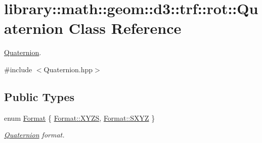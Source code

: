 \hypertarget{classlibrary_1_1math_1_1geom_1_1d3_1_1trf_1_1rot_1_1_quaternion}{}\section{library\+:\+:math\+:\+:geom\+:\+:d3\+:\+:trf\+:\+:rot\+:\+:Quaternion Class Reference}
\label{classlibrary_1_1math_1_1geom_1_1d3_1_1trf_1_1rot_1_1_quaternion}


\hyperlink{classlibrary_1_1math_1_1geom_1_1d3_1_1trf_1_1rot_1_1_quaternion}{Quaternion}.  




{\ttfamily \#include $<$Quaternion.\+hpp$>$}

\subsection*{Public Types}
\begin{DoxyCompactItemize}
\item 
enum \hyperlink{classlibrary_1_1math_1_1geom_1_1d3_1_1trf_1_1rot_1_1_quaternion_aa86c54f6157891b2f1a517c672d6deec}{Format} \{ \hyperlink{classlibrary_1_1math_1_1geom_1_1d3_1_1trf_1_1rot_1_1_quaternion_aa86c54f6157891b2f1a517c672d6deeca11c51ecd5dc6f86ba3c1ae79e21482f5}{Format\+::\+X\+Y\+ZS}, 
\hyperlink{classlibrary_1_1math_1_1geom_1_1d3_1_1trf_1_1rot_1_1_quaternion_aa86c54f6157891b2f1a517c672d6deecabd514d63fd7944bc7d3718aeef3684be}{Format\+::\+S\+X\+YZ}
 \}\begin{DoxyCompactList}\small\item\em \hyperlink{classlibrary_1_1math_1_1geom_1_1d3_1_1trf_1_1rot_1_1_quaternion}{Quaternion} format. \end{DoxyCompactList}
\end{DoxyCompactItemize}
